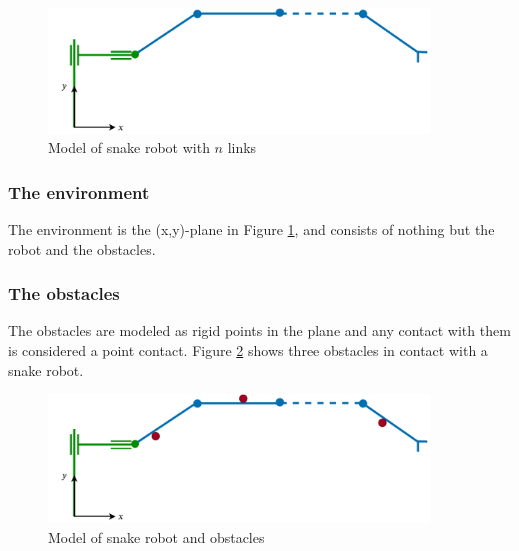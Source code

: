 \begin{figure}[h!]
    \centering
    \includegraphics[width=0.9\textwidth]{figures/modelspecs/superbasicsnake.pdf}
    \caption{Model of snake robot with $n$ links}
    \label{fig:2_kin}
\end{figure}


\subsubsection{The environment}
The environment is the (x,y)-plane in Figure \ref{fig:2_kin}, and consists of nothing but the robot and the obstacles.



\subsubsection{The obstacles}

The obstacles are modeled as rigid points in the plane and any contact with them is considered a point contact. Figure \ref{fig:2_kin_obst} shows three obstacles in contact with a snake robot.

\begin{figure}[h!]
    \centering
    \includegraphics[width=0.9\textwidth]{figures/modelspecs/superbasicsnakenobstacles.pdf}
    \caption{Model of snake robot and obstacles}
    \label{fig:2_kin_obst}
\end{figure}








